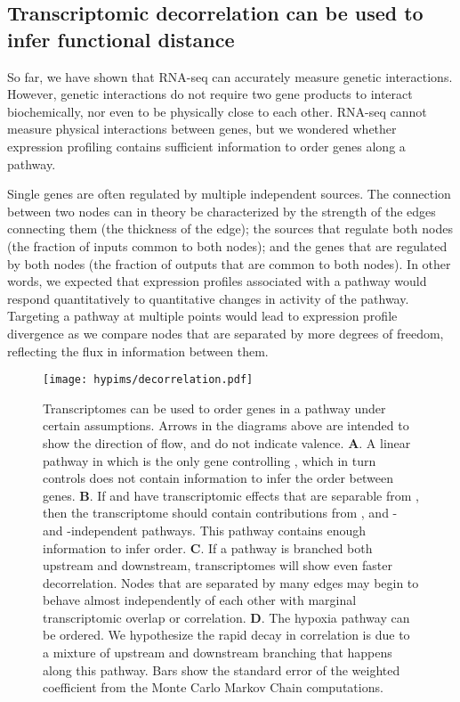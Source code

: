 \subsection*{Transcriptomic decorrelation can be used to infer functional distance}
\label{sub:decorrelation}
So far, we have shown that RNA-seq can accurately measure genetic interactions.
However, genetic interactions do not require two gene products to interact
biochemically, nor even to be physically close to each other. RNA-seq cannot
measure physical interactions between genes, but we wondered whether expression
profiling contains sufficient information to order genes along a pathway.

Single genes are often regulated by multiple independent sources. The connection
between two nodes can in theory be characterized by the strength of the edges
connecting them (the thickness of the edge); the sources that regulate both
nodes (the fraction of inputs common to both nodes); and the genes that are
regulated by both nodes (the fraction of outputs that are common to both nodes).
In other words, we expected that expression profiles associated with a pathway
would respond quantitatively to quantitative changes in activity of the pathway.
Targeting a pathway at multiple points would lead to expression profile
divergence as we compare nodes that are separated by more degrees of freedom,
reflecting the flux in information between them.

\begin{figure}[tbhp]
  \centering
  \texttt{[image: hypims/decorrelation.pdf]}
  \caption{
    Transcriptomes can be used to order genes in a pathway under
    certain assumptions. Arrows in the diagrams above are intended to show the
    direction of flow, and do not indicate valence. \textbf{A}. A linear pathway
    in which  is the only gene controlling , which in
    turn controls  does not contain information to infer the order
    between genes. \textbf{B}. If  and  have
    transcriptomic effects that are separable from , then the
     transcriptome should contain contributions from ,
     and - and -independent pathways. This
    pathway contains enough information to infer order. \textbf{C}. If a pathway
    is branched both upstream and downstream, transcriptomes will show even
    faster decorrelation. Nodes that are separated by many edges may begin to
    behave almost independently of each other with marginal transcriptomic
    overlap or correlation. \textbf{D}. The hypoxia pathway can be ordered. We
    hypothesize the rapid decay in correlation is due to a mixture of upstream
    and downstream branching that happens along this pathway. Bars show the
    standard error of the weighted coefficient from the Monte Carlo Markov Chain
    computations.
  }
\label{fig:decorrelation}
\end{figure}

